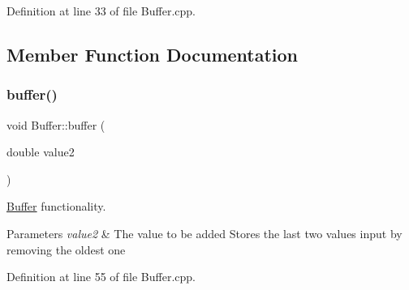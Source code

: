 Definition at line 33 of file Buffer.\+cpp.


\begin{DoxyCode}{0}

\end{DoxyCode}


\subsection{Member Function Documentation}
\mbox{\label{class_buffer_a43bc2e8725cb4f43bbf4b67d2c787fd1}} 
\subsubsection{\texorpdfstring{buffer()}{buffer()}}
{\footnotesize\ttfamily void Buffer\+::buffer (\begin{DoxyParamCaption}\item[{double}]{value2 }\end{DoxyParamCaption})}



\mbox{\hyperlink{class_buffer}{Buffer}} functionality. 


\begin{DoxyParams}{Parameters}
{\em value2} & The value to be added Stores the last two values input by removing the oldest one \\
\hline
\end{DoxyParams}


Definition at line 55 of file Buffer.\+cpp.


